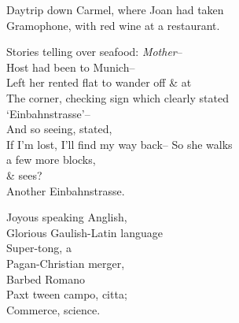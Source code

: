 Daytrip down Carmel, where Joan had taken \\
Gramophone, with red wine at a restaurant.

Stories telling over seafood: \textit{Mother}-- \\
Host had been to Munich-- \\
Left her rented flat to wander off \& at \\
The corner, checking sign which clearly stated \\
`Einbahnstrasse'-- \\
And so seeing, stated, \\
If I'm lost, I'll find my way back--
So she walks \\
a few more blocks, \\
\& sees? \\
Another Einbahnstrasse.

Joyous speaking Anglish, \\
Glorious Gaulish-Latin language \\
Super-tong, a \\
Pagan-Christian merger,  \\
Barbed Romano \\
Paxt tween campo, citta; \\
Commerce, science.